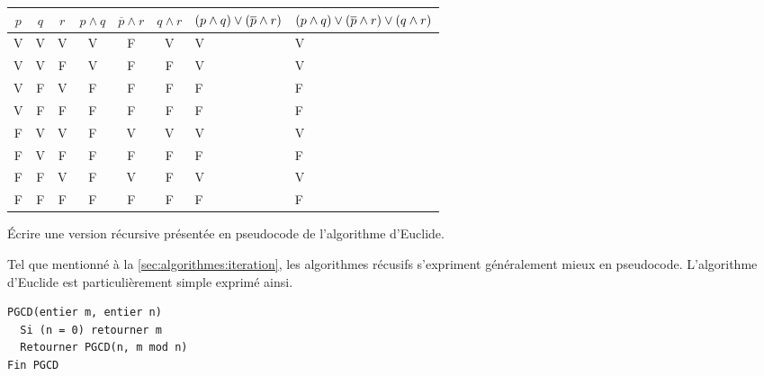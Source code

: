 \begin{exercice}
\begin{sol}
\begin{enumerate}
\begin{tabularx}{\linewidth}{*{6}{c}>{\centering\arraybackslash}X>{\centering\arraybackslash}X}
        \toprule
        $p$ & $q$ & $r$ & $p \wedge q$ & $\overline{p} \wedge r$ & $q \wedge r$ & $(p \wedge q) \newline\vee (\overline{p} \wedge r)$ & $(p \wedge q) \newline\vee (\overline{p} \wedge r) \newline\vee (q \wedge r)$
        \\
        \midrule
        V & V & V & V & F & V & V & V \\
        V & V & F & V & F & F & V & V \\
        V & F & V & F & F & F & F & F \\
        V & F & F & F & F & F & F & F \\
        F & V & V & F & V & V & V & V \\
        F & V & F & F & F & F & F & F \\
        F & F & V & F & V & F & V & V \\
        F & F & F & F & F & F & F & F \\
        \bottomrule
      \end{tabularx}
    \end{enumerate}
  \end{sol}
\end{exercice}

\begin{exercice}
  Écrire une version récursive présentée en pseudocode de l'algorithme
  d'Euclide.
  \begin{sol}
    Tel que mentionné à la \autoref{sec:algorithmes:iteration}, les
    algorithmes récusifs s'expriment généralement mieux en pseudocode.
    L'algorithme d'Euclide est particulièrement simple
    exprimé ainsi.
    \begin{Schunk}
\begin{Verbatim}
PGCD(entier m, entier n)
  Si (n = 0) retourner m
  Retourner PGCD(n, m mod n)
Fin PGCD
\end{Verbatim}
    \end{Schunk}
  \end{sol}
\end{exercice}

